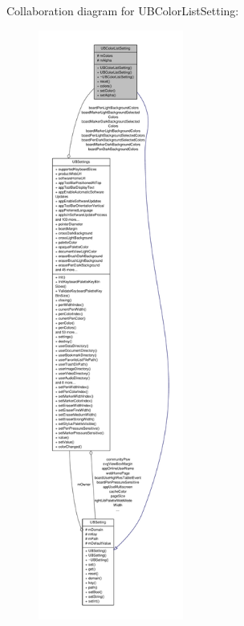 Collaboration diagram for U\-B\-Color\-List\-Setting\-:
\nopagebreak
\begin{figure}[H]
\begin{center}
\leavevmode
\includegraphics[height=550pt]{d7/d41/class_u_b_color_list_setting__coll__graph}
\end{center}
\end{figure}
